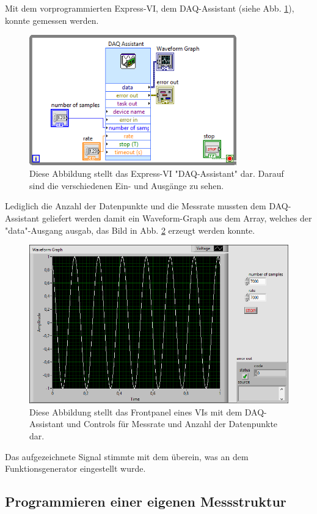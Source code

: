 Mit dem vorprogrammierten Express-VI, dem DAQ-Assistant (siehe Abb. \ref{fig:daq}), konnte gemessen werden.
\begin{figure}[ht]
	\centering
	\includegraphics[width=0.8\textwidth]{pic/daq.png}
	\caption{Diese Abbildung stellt das Express-VI "DAQ-Assistant" dar. Darauf sind die verschiedenen Ein- und Ausgänge zu sehen.}
	\label{fig:daq}	
\end{figure}
Lediglich die Anzahl der Datenpunkte und die Messrate mussten dem DAQ-Assistant geliefert werden damit ein Waveform-Graph aus dem Array, welches der "data"-Ausgang ausgab, das Bild in Abb. \ref{fig:daq_sig} erzeugt werden konnte. 
\begin{figure}[ht]
	\centering
	\includegraphics[width=\textwidth]{pic/daq_sig.png}
	\caption{Diese Abbildung stellt das Frontpanel eines VIs mit dem DAQ-Assistant und Controls für Messrate und Anzahl der Datenpunkte dar.}
	\label{fig:daq_sig}	
\end{figure}
Das aufgezeichnete Signal stimmte mit dem überein, was an dem Funktionsgenerator eingestellt wurde.


\newpage
\subsection{Programmieren einer eigenen Messstruktur}

